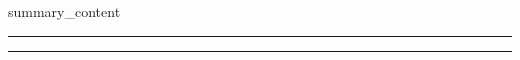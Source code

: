 \documentclass[9pt]{developercv} %
\begin{document}

    \noindent
    \begin{minipage}[t]{0.275\textwidth} %
        \vspace{0pt} %
    \end{minipage}
    \hfill
    \begin{minipage}[t]{0.725\textwidth} %
        \vspace{1.1\baselineskip} %

        {{summary_content}}
    \end{minipage}
    \noindent
    \textcolor{line-color}{\rule{0.25\textwidth}{0.5pt}} %
    \hfill
    \textcolor{line-color}{\rule{0.725\textwidth}{0.5pt}} %


\end{document}
